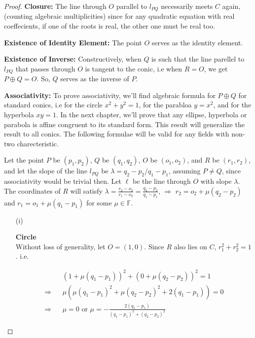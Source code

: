 \begin{proof}\textbf{Closure:} The line through $O$ parallel to $l_{PQ}$ necessarily meets $C$
  again, (counting algebraic multiplicities) since for any quadratic equation with real 
  coeffecients, if one of the roots is real, the other one must be real too. \vspace{10pt}

  \textbf{Existence of Identity Element:} The point $O$ serves as the identity element.\vspace{10pt}

  \textbf{Existence of Inverse:} Constructively, when $Q$ is such that the line parellel to
  $l_{PQ}$ that passes through $O$ is tangent to the conic, i.e when $R=O$, we get
  $P\oplus Q=O$. So, $Q$ serves as the inverse of $P$. \vspace{10pt}

  \textbf{Associativity:} To prove associativity, we'll find algebraic formula for $P\oplus Q$
  for standard conics, i.e for the circle $x^2+y^2=1$, for the parabloa $y=x^2$, and for the
  hyperbola $xy=1$. In the next chapter, we'll prove that any ellipse, hyperbola or parabola
  is affine congruent to its standard form. This result will generalize the result to all
  conics. The following formulae will be valid for any fields with non-two charecteristic.

  Let the point $P$ be $(p_1,p_2)$, $Q$ be $(q_1,q_2)$, $O$ be $(o_1,o_2)$, and $R$ be
  $(r_1,r_2)$, and let the slope of the line $l_{PQ}$ be $\lambda=q_2-p_2/q_1-p_1$, assuming
  $P\not=Q$, since associativity would be trivial then. Let $\ell$ be the line through $O$
  with slope $\lambda$. The coordinates of $R$ will satisfy
  $\lambda=\frac{r_2-o_2}{r_1-o_2}=\frac{q_2-p_2}{q_1-p_1}$,
  $\Rightarrow$ $r_2=o_2+\mu(q_2-p_2)$ and $r_1=o_1+\mu(q_1-p_1)$ for some $\mu\in\mathbb{F}$.

  \begin{itemize}
    \item[(i)]{
        \textbf{Circle}\\
        Without loss of generality, let $O=(1,0)$. Since $R$ also lies on $C$,
        $r_1^2+r_2^2=1$. i.e.

        \begin{eqnarray*}
          &&(1+\mu(q_1-p_1))^2+(0+\mu(q_2-p_2))^2=1\\
          \Longrightarrow&& \mu(\mu(q_1-p_1)^2+\mu(q_2-p_2)^2+2(q_1-p_1))=0\\
          \Longrightarrow&& \mu=0\text{ or }\mu=-\frac{2(q_1-p_1)}{(q_1-p_1)^2+(q_2-p_2)^2}
        \end{eqnarray*}

}
\end{itemize}
\end{proof}
